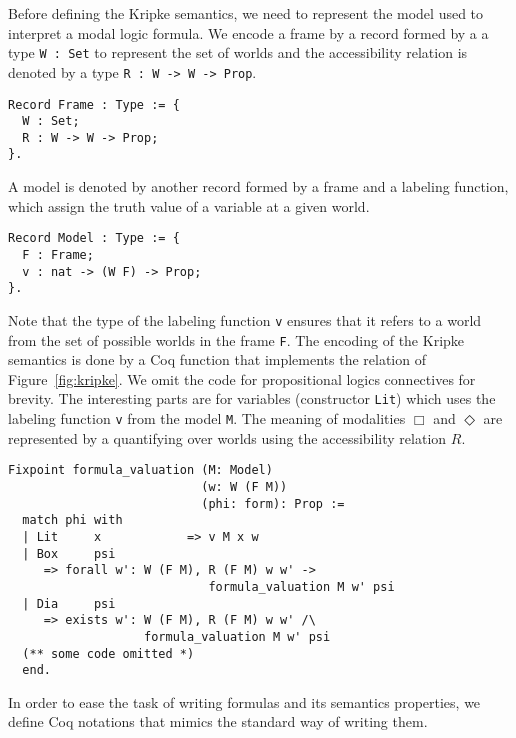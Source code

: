 \documentclass[sigconf]{acmart}
\begin{document}
Before defining the Kripke semantics, we need to represent the model used to
interpret a modal logic formula. We encode a frame by a record formed by a
a type \texttt{W : Set} to represent the set of worlds and the
accessibility relation is denoted by a type \texttt{R : W -> W -> Prop}.
\begin{verbatim}
Record Frame : Type := {
  W : Set;
  R : W -> W -> Prop;
}.
\end{verbatim}
A model is denoted by another record formed by a frame and a labeling function,
which assign the truth value of a variable at a given world.
\begin{verbatim}
Record Model : Type := {
  F : Frame; 
  v : nat -> (W F) -> Prop; 
}.
\end{verbatim}
Note that the type of the labeling function \texttt{v} ensures that it
refers to a world from the set of possible worlds in the frame
\texttt{F}. The encoding of the Kripke semantics is done by a Coq function
that implements the relation of Figure~\ref{fig:kripke}. We omit the code
for propositional logics connectives for brevity. The interesting parts are for
variables (constructor \texttt{Lit}) which uses the labeling function
\texttt{v} from the model \texttt{M}. The meaning of
modalities $\Box$ and $\Diamond$ are represented by a quantifying over worlds
using the accessibility relation $R$. 
\begin{verbatim}
Fixpoint formula_valuation (M: Model)
                           (w: W (F M))
                           (phi: form): Prop :=
  match phi with
  | Lit     x            => v M x w 
  | Box     psi
     => forall w': W (F M), R (F M) w w' ->
                            formula_valuation M w' psi
  | Dia     psi
     => exists w': W (F M), R (F M) w w' /\
                   formula_valuation M w' psi
  (** some code omitted *)
  end.
\end{verbatim}
In order to ease the task of writing formulas and its semantics properties, we
define Coq notations that mimics the standard way of writing them.
\end{document}
